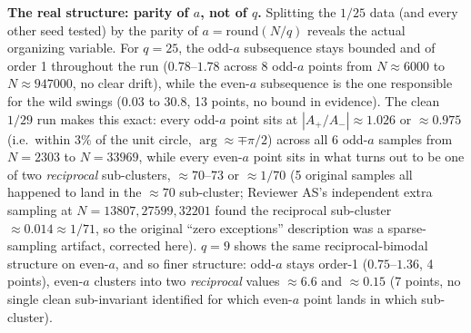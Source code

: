 \textbf{The real structure: parity of $a$, not of $q$.} Splitting the $1/25$ data (and every
other seed tested) by the parity of $a=\mathrm{round}(N/q)$ reveals the actual organizing
variable. For $q=25$, the odd-$a$ subsequence stays bounded and of order 1 throughout the run
($0.78$--$1.78$ across 8 odd-$a$ points from $N\approx6000$ to $N\approx947000$, no clear drift),
while the even-$a$ subsequence is the one responsible for the wild swings ($0.03$ to $30.8$,
13 points, no bound in evidence). The clean $1/29$ run makes this exact: every odd-$a$ point sits
at $|A_+/A_-|\approx1.026$ or $\approx0.975$ (i.e.\ within $3\%$ of the unit circle, $\arg\approx
\mp\pi/2$) across all 6 odd-$a$ samples from $N=2303$ to $N=33969$, while every even-$a$ point sits
in what turns out to be one of two \emph{reciprocal} sub-clusters, $\approx70$--$73$ or
$\approx1/70$ (5 original samples all happened to land in the $\approx70$ sub-cluster; Reviewer AS's
independent extra sampling at $N=13807,27599,32201$ found the reciprocal sub-cluster
$\approx0.014\approx1/71$, so the original ``zero exceptions'' description was a sparse-sampling
artifact, corrected here). $q=9$ shows the same reciprocal-bimodal structure on even-$a$, and so
finer structure: odd-$a$ stays order-1 ($0.75$--$1.36$, 4 points), even-$a$ clusters into two
\emph{reciprocal} values $\approx6.6$ and $\approx0.15$ (7 points, no single clean sub-invariant
identified for which even-$a$ point lands in which sub-cluster).

